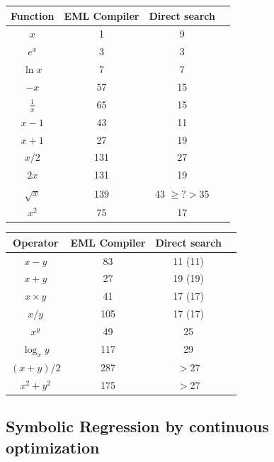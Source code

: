 \documentclass[12pt]{article}
\begin{document}
\begin{table}[]
    \begin{tabular}{c|ccc}
      Function & EML Compiler & Direct search  \\
      \hline
        $x$              &  1           & 9    \\
        $e^x$            &  3           & 3    \\
        $\ln{x}$         &  7           & 7    \\ 
        $-x$             &  57          & 15   \\
        $\frac{1}{x}$    &  65          & 15   \\
        $x-1$            &  43          & 11   \\
        $x+1$            &  27          & 19   \\
        $x/2$            &  131         & 27     \\
        $2x$             &  131         & 19     \\
        $\sqrt{x}$       &  139         & 43 $\geq ? >$35  \\
		$x^2$            &  75          & 17   \\
    \end{tabular}
    \begin{tabular}{c|ccc}
     Operator & EML Compiler & Direct search \\
      \hline
        $x-y$              &  83         & 11 (11) \\
		$x+y$              &  27         & 19 (19) \\
        $x \times y$       &  41         & 17 (17) \\
        $x/y$              &  105        & 17 (17) \\
        $x^y$              &  49         & 25      \\
        $\log_x{y}$        &  117        & 29      \\
        $(x+y)/2$          &  287        & $>$27\\
        $x^2+y^2$          &  175        & $>$27\\
    \end{tabular}
    
\end{table}




\subsection{\label{subsect:continuos} Symbolic Regression by continuous optimization }
\end{document}
